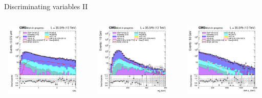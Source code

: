 \documentclass[8pt]{beamer}
\begin{document}
\begin{frame}{Discriminating variables II}
\begin{columns}
\begin{column}{0.33\textwidth}
\begin{center}
    		\end{center}		
		\end{column}
\end{columns}
\begin{columns}
		\begin{column}{0.33\textwidth}
			\begin{center}
     			\includegraphics[width=1.0\textwidth, height=100pt]{figs/2016/SmearSR-ttDM-scalar100/log_cratio_topCR_ll_r2l4j.png}
    		\end{center}		
		\end{column}
		\begin{column}{0.33\textwidth}
			\begin{center}
     			\includegraphics[width=1.0\textwidth, height=100pt]{figs/2016/SmearSR-ttDM-scalar100/log_cratio_topCR_ll_mblt.png}
    		\end{center}		
		\end{column}
		\begin{column}{0.33\textwidth}
			\begin{center}
     			\includegraphics[width=1.0\textwidth, height=100pt]{figs/2016/SmearSR-ttDM-scalar100/log_cratio_topCR_ll_dark_pt.png}
    		\end{center}		
		\end{column}
\end{columns} \vfill
\end{frame}
\end{document}
